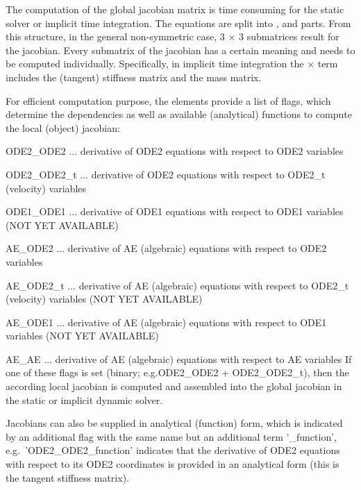 

The computation of the global jacobian matrix is time consuming for the static solver or implicit time integration.
The equations are split into \SON, \FON and \AEN parts. From this structure, in the general non-symmetric case, 3 $\times$ 3 submatrices result for the jacobian.
Every submatrix of the jacobian has a certain meaning and needs to be computed individually.
Specifically, in implicit time integration the \SON $\times$ \SON term includes the (tangent) stiffness matrix and the mass matrix.

For efficient computation purpose, the elements provide a list of flags, which determine the dependencies as well as available (analytical) functions to compute the local (object) jacobian:
\bi
  \item ODE2\_ODE2 $\ldots$ derivative of ODE2 equations with respect to ODE2 variables
  \item ODE2\_ODE2\_t $\ldots$ derivative of ODE2 equations with respect to ODE2\_t (velocity) variables
  \item ODE1\_ODE1 $\ldots$ derivative of ODE1 equations with respect to ODE1 variables (NOT YET AVAILABLE)
  \item AE\_ODE2 $\ldots$ derivative of AE (algebraic) equations with respect to ODE2 variables
  \item AE\_ODE2\_t $\ldots$ derivative of AE (algebraic) equations with respect to ODE2\_t (velocity) variables (NOT YET AVAILABLE)
  \item AE\_ODE1 $\ldots$ derivative of AE (algebraic) equations with respect to ODE1 variables (NOT YET AVAILABLE)
  \item AE\_AE $\ldots$ derivative of AE (algebraic) equations with respect to AE variables
\ei
If one of these flags is set (binary; e.g.ODE2\_ODE2 + ODE2\_ODE2\_t), then the according local jacobian is computed and assembled into the global jacobian in the static or implicit dynamic solver.

Jacobians can also be supplied in analytical (function) form, which is indicated by an additional flag with the same name but an additional term '\_function', e.g.\ 'ODE2\_ODE2\_function' indicates that the derivative of ODE2 equations with respect to its ODE2 coordinates is provided in an analytical form (this is the tangent stiffness matrix).

